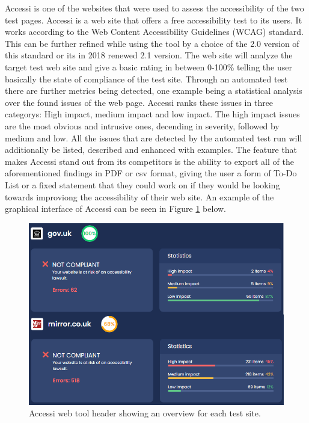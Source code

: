 Accessi \parencite{Accessi} is one of the websites that were used to assess the accessibility of the two test pages. Accessi is a web site that offers a free accessibility test to its users. It works according to the Web Content Accessibility Guidelines (WCAG) standard. This can be further refined while using the tool by a choice of the 2.0 version of this standard or its in 2018 renewed 2.1 version.  
The web site will analyze the target test web site and give a basic rating in between 0-100\% telling the user basically the state of compliance of the test site. Through an automated test there are further metrics being detected, one example being a statistical analysis over the found issues of the web page. Accessi ranks these issues in three categorys: High impact, medium impact and low inpact. The high impact issues are the most obvious and intrusive ones, decending in severity, followed by medium and low. All the issues that are detected by the automated test run will additionally be listed, described and enhanced with examples. The feature that makes Accessi stand out from its competitors is the ability to export all of the aforementioned findings in PDF or csv format, giving the user a form of To-Do List or a fixed statement that they could work on if they would be looking towards improviong the accessibility of their web site. An example of the graphical interface of Accessi can be seen in Figure \ref{fig:accessi} below.

\begin{figure}[tp]
    \centering
    \includegraphics[keepaspectratio,width=\linewidth,height=\halfh]
    {images/accessi.png}
    
    \caption[Accessi Overview]
    {%
    Accessi web tool header showing an overview for each test site.
    }
    \label{fig:accessi}
\end{figure}

